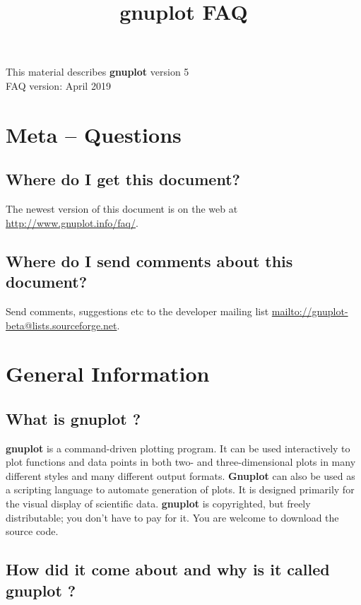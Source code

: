 \documentclass[a4paper,11pt]{article}
\def\http#1{{\small\href{http://#1}{\url{http://#1}}}}
\def\mailto#1{{\small\href{mailto://#1}{\url{mailto://#1}}}}
\newcommand{\mailto}[1]%
            {\htmladdnormallink{\latex{\url{<#1>}}\html{\textit{#1}}}%
                {mailto:#1}%
            }
\newcommand{\http}[1]%
            {\htmladdnormallink{\latex{\url{http://#1}}%
                    \html{\textit{http://#1}}}%
                {http://#1}%
            }
\newcommand{\gnuplot}{\textbf{gnuplot }}
\newcommand{\Gnuplot}{\textbf{Gnuplot }}
\begin{document}
\title{\gnuplot FAQ}
\author{}
\date{}
\maketitle

\noindent
This material describes \gnuplot version 5
        \\
FAQ version: April 2019


\tableofcontents

\newpage
\setcounter{section}{-1}
\section{Meta -- Questions}

\subsection{Where do I get this document?}

The newest version of this document is on the web at
\http{www.gnuplot.info/faq/}.

\subsection{Where do I send comments about this document?}

Send comments, suggestions etc to the developer mailing list
\mailto{gnuplot-beta@lists.sourceforge.net}.

\section{General Information}

\subsection{What is \gnuplot?}

\gnuplot is a command-driven plotting program.
It can be used interactively to plot functions and data points in
both two- and three-dimensional plots in many different styles and
many different output formats.  \Gnuplot can also be used as a
scripting language to automate generation of plots.
It is designed primarily for the visual display of scientific data.
\gnuplot is copyrighted, but freely distributable;
you don't have to pay for it. You are welcome to download the source code.


\subsection{How did it come about and why is it called \gnuplot?}
\end{document}
